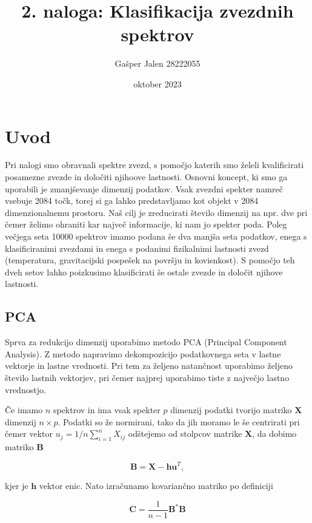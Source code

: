 \documentclass[11pt,a4paper]{article}
\title{2. naloga: Klasifikacija zvezdnih spektrov}
\author{Gašper Jalen 28222055}
\date{oktober 2023}
\begin{document}
\maketitle

\section{Uvod}

Pri nalogi smo obravnali spektre zvezd, s pomočjo katerih smo želeli kvalificirati posamezne zvezde in določiti njihoove lastnosti. Osnovni koncept, ki smo ga uporabili je zmanjševanje dimenzij podatkov. Vsak zvezdni spekter namreč vsebuje 2084 točk, torej si ga lahko predstavljamo kot objekt v 2084 dimenzionalnemu prostoru. Naš cilj je zreducirati število dimenzij na npr. dve pri čemer želimo ohraniti kar največ informacije, ki nam jo spekter poda. Poleg večjega seta 10000 spektrov imamo podana še dva manjša seta podatkov, enega s klasificiranimi zvezdami in enega s podanimi fizikalnimi lastnosti zvezd (temperatura, gravitacijski pospešek na površju in kovisnkost). S pomočjo teh dveh setov lahko poizkusimo klasificirati še ostale zvezde in določit njihove lastnosti.

\subsection{PCA}

Sprva za redukcijo dimenzij uporabimo metodo PCA (Principal Component Analysis). Z metodo napravimo dekompozicijo podatkovnega seta v lastne vektorje in lastne vrednosti. Pri tem za željeno natančnost uporabimo željeno število lastnih vektorjev, pri čemer najprej uporabimo tiste z največjo lastno vrednostjo.

Če imamo $n$ spektrov in ima vsak spekter $p$ dimenzij podatki tvorijo matriko $\mathbf{X}$ dimenzij $n \times p$. Podatki so že normirani, tako da jih moramo le še centrirati pri čemer vektor $u_j = 1/n \sum_{i=1}^nX_{ij}$ odštejemo od stolpcov matrike $\mathbf{X}$, da dobimo matriko $\mathbf{B}$

\begin{equation}
	\mathbf{B} = \mathbf{X} - \mathbf{hu}^T,
\end{equation}

kjer je $\mathbf{h}$ vektor enic. Nato izračunamo kovariančno matriko po definiciji

\begin{equation}
	\mathbf{C} = \frac{1}{n-1}\mathbf{B}^*\mathbf{B}
\end{equation}
\end{document}

